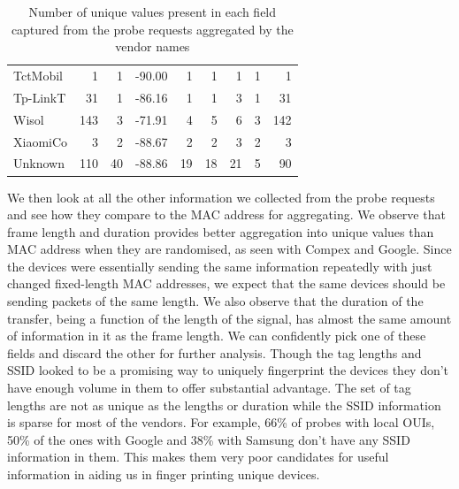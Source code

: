 \begin{table}
\begin{center}
\begin{tabular}{lrrrrrrrr}
  TctMobil &    1 &   1 & -90.00 &   1 &   1 &   1 &   1 &   1 \\ 
  Tp-LinkT &   31 &   1 & -86.16 &   1 &   1 &   3 &   1 &  31 \\ 
  Wisol    &  143 &   3 & -71.91 &   4 &   5 &   6 &   3 & 142 \\ 
  XiaomiCo &    3 &   2 & -88.67 &   2 &   2 &   3 &   2 &   3 \\ 
  Unknown  &  110 &  40 & -88.86 &  19 &  18 &  21 &   5 &  90 \\ 
  \bottomrule
  \end{tabular}
\end{center}
\caption{Number of unique values present in each field captured from the probe requests aggregated by the vendor names}
\label{table:collection:proberequests}
\end{table}

We then look at all the other information we collected from the probe requests and see how they compare to the MAC address for aggregating.
We observe that frame length and duration provides better aggregation into unique values than MAC address when they are randomised, as seen with Compex and Google.
Since the devices were essentially sending the same information repeatedly with just changed fixed-length MAC addresses, we expect that the same devices should be sending packets of the same length.
We also observe that the duration of the transfer, being a function of the length of the signal, has almost the same amount of information in it as the frame length.
We can confidently pick one of these fields and discard the other for further analysis.
Though the tag lengths and SSID looked to be a promising way to uniquely fingerprint the devices they don't have enough volume in them to offer substantial advantage.
The set of tag lengths are not as unique as the lengths or duration while the SSID information is sparse for most of the vendors.
For example, 66\% of probes with local OUIs, 50\% of the ones with Google and 38\% with Samsung don't have any SSID information in them.
This makes them very poor candidates for useful information in aiding us in finger printing unique devices.


